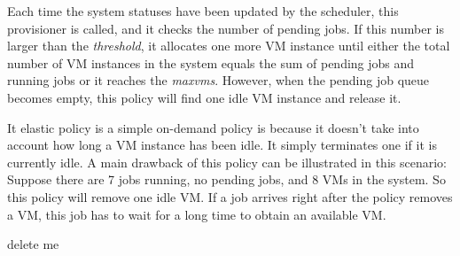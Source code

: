 Each time the system statuses have been updated by the scheduler, this
provisioner is called, and it checks the number of pending jobs. If
this number is larger than the \emph{threshold}, it allocates one more
VM instance until either the total number of VM instances in the
system equals the sum of pending jobs and running jobs or it reaches
the \emph{maxvms}. However, when the pending job queue becomes empty,
this policy will find one idle VM instance and release it.

It elastic policy is a simple on-demand policy is because it doesn't
take into account how long a VM instance has been idle. It simply
terminates one if it is currently idle. A main drawback of this policy
can be illustrated in this scenario: Suppose there are 7 jobs running,
no pending jobs, and 8 VMs in the system. So this policy will remove
one idle VM. If a job arrives right after the policy removes a VM,
this job has to wait for a long time to obtain an available VM.


delete me

